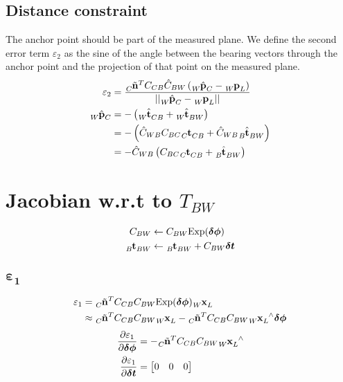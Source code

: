 \documentclass[10pt,a4paper]{article}
\numberwithin{equation}{section}
\renewcommand{\vec}[1]{\ensuremath{\mathbf{#1}}}
\newcommand{\vecs}[1]{\ensuremath{\boldsymbol{#1}}}
\newcommand{\norm}[1]{\ensuremath{\left|\left|#1\right|\right|}}
\newcommand{\Exp}{\mathrm{Exp}}
\begin{document}
\subsection{Distance constraint}
The anchor point should be part of the measured plane. We define the second error term $\varepsilon_2$ as the sine of the angle between the bearing vectors through the anchor point and the projection of that point on the measured plane.  
\begin{align}
\varepsilon_2 &= \frac{\tensor[_C]{\tilde{\vec{n}}}{^T} C_{CB} \hat{C}_{BW} \left(\tensor[_W]{\hat{\vec{p}}}{_C} - \tensor[_W]{\vec{p}}{_L}\right)}{\norm{\tensor[_W]{\hat{\vec{p}}}{_C} - \tensor[_W]{\vec{p}}{_L}}}\\
\tensor[_W]{\hat{\vec{p}}}{_C} &= -\left(\tensor[_W]{\hat{\vec{t}}}{_{CB}}+\tensor[_W]{\hat{\vec{t}}}{_{BW}}\right)\\ 
&=-\left(\hat{C}_{WB} C_{BC} \tensor[_C]{\vec{t}}{_{CB}} + 
\hat{C}_{WB} \tensor[_B]{\hat{\vec{t}}}{_{BW}}\right)\\
&=-\hat{C}_{WB} \left(C_{BC} \tensor[_C]{\vec{t}}{_{CB}} + 
\tensor[_B]{\hat{\vec{t}}}{_{BW}}\right)
\end{align}
\section{Jacobian w.r.t to $T_{BW}$}
\begin{align}
C_{BW} &\leftarrow C_{BW}\Exp(\vecs{\delta\phi})\\
\tensor[_B]{\vec{t}}{_{BW}} &\leftarrow \tensor[_B]{\vec{t}}{_{BW}} + C_{BW}\vecs{\delta t}
\end{align}
\subsection{$\vecs{\varepsilon_1}$}
\begin{align}
\varepsilon_1 &= \tensor[_C]{\tilde{\vec{n}}}{^T}C_{CB} C_{BW}\Exp(\vecs{\delta\phi}) \tensor[_W]{\vec{x}}{_L}\\
&\approx \tensor[_C]{\tilde{\vec{n}}}{^T}C_{CB} C_{BW}\tensor[_W]{\vec{x}}{_L} - \tensor[_C]{\tilde{\vec{n}}}{^T}C_{CB} C_{BW} \tensor[_W]{\vec{x}}{_L^\wedge}\vecs{\delta\phi}
\end{align}
\begin{align}
\frac{\partial \varepsilon_1}{\partial\vecs{\delta\phi}} &= -\tensor[_C]{\tilde{\vec{n}}}{^T}C_{CB} C_{BW}\tensor[_W]{\vec{x}}{_L^\wedge}\\
\frac{\partial \varepsilon_1}{\partial\vecs{\delta t}} &= \begin{bmatrix} 0&0&0 \end{bmatrix}
\end{align}
\end{document}
